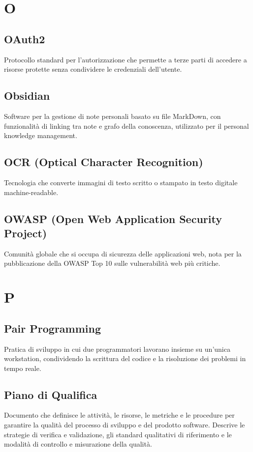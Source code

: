 \documentclass[a4paper,11pt]{article}
\begin{document}
\newpage
\section{O}

\subsection{OAuth2}
Protocollo standard per l'autorizzazione che permette a terze parti di accedere a risorse protette senza condividere le credenziali dell'utente.

\subsection{Obsidian}
Software per la gestione di note personali basato su file MarkDown, con funzionalità di linking tra note e grafo della conoscenza, utilizzato per il personal knowledge management.

\subsection{OCR (Optical Character Recognition)}
Tecnologia che converte immagini di testo scritto o stampato in testo digitale machine-readable.

\subsection{OWASP (Open Web Application Security Project)}
Comunità globale che si occupa di sicurezza delle applicazioni web, nota per la pubblicazione della OWASP Top 10 sulle vulnerabilità web più critiche.

\newpage
\section{P}

\subsection{Pair Programming}
Pratica di sviluppo in cui due programmatori lavorano insieme su un'unica workstation, condividendo la scrittura del codice e la risoluzione dei problemi in tempo reale.

\subsection{Piano di Qualifica}
Documento che definisce le attività, le risorse, le metriche e le procedure per garantire la qualità del processo di sviluppo e del prodotto software. Descrive le strategie di verifica e validazione, gli standard qualitativi di riferimento e le modalità di controllo e misurazione della qualità.
\end{document}
